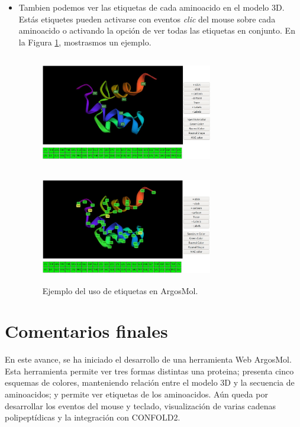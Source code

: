 \documentclass{article}
\begin{document}
\begin{itemize}
	\item Tambien podemos ver las etiquetas de cada aminoacido en el modelo 3D. Estás etiquetes pueden activarse con eventos \textit{clic} del mouse sobre cada aminoacido o activando la opción de ver todas las etiquetas en conjunto. En la Figura \ref{fig:argos4}, mostrasmos un ejemplo.
	
	\begin{figure}[H]
		\centering
		\begin{multicols}{2}
			\includegraphics[width=7.5cm,height=5cm]{img/papers/argos11}\par 
			\includegraphics[width=7.5cm,height=5cm]{img/papers/argos10}\par 
		\end{multicols}
		\caption{Ejemplo del uso de etiquetas en ArgosMol.}
		\label{fig:argos4}
	\end{figure}
	
\end{itemize}
	
\section{Comentarios finales}
En este avance, se ha iniciado el desarrollo de una herramienta Web ArgosMol. Esta herramienta permite ver tres formas distintas una proteina; presenta cinco esquemas de colores, manteniendo relación entre 
el modelo 3D y la secuencia de aminoacidos; y permite ver etiquetas de los aminoacidos. Aún queda por desarrollar los eventos del mouse y teclado, visualización de varias cadenas polipeptídicas y la integración con CONFOLD2.

	
	
	
	
	
	
	
	
\end{document}
